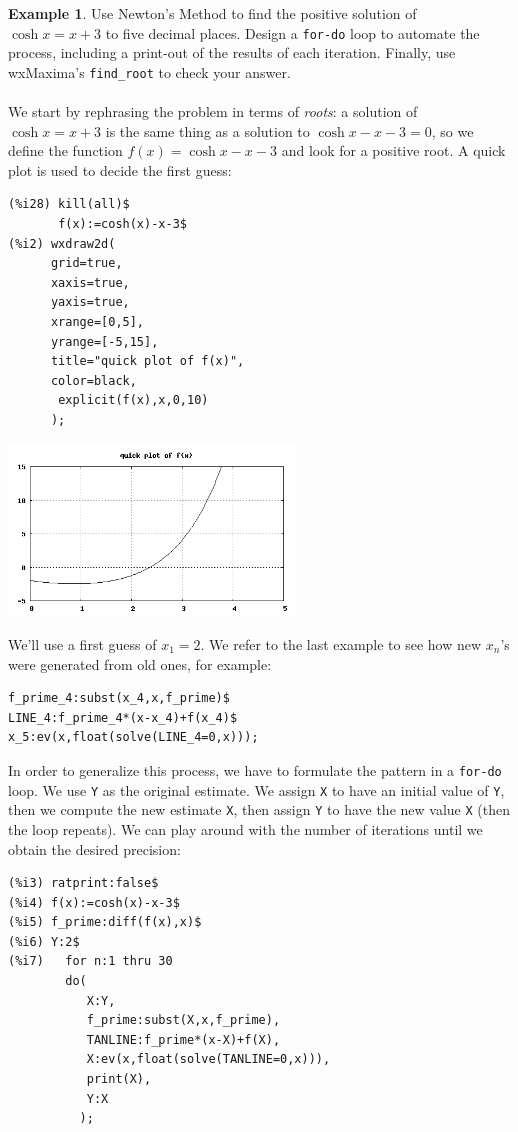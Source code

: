 \documentclass[10.5pt,twoside]{report}
\theoremstyle{definition}
\newtheorem{exmp}{Example}[section]
\begin{document}
\begin{exmp}Use Newton's Method to find the positive solution of $\cosh{x}=x+3$ to five decimal places.  Design a \verb|for-do| loop to automate the process, including a print-out of the results of each iteration. Finally, use wxMaxima's \verb|find_root| to check your answer.\\
${}$\\

We start by rephrasing the problem in terms of \textit{roots}:  a solution of $\cosh{x}=x+3$ is the same thing as a solution to $\cosh{x}-x-3=0$, so we define the function $f(x)=\cosh{x}-x-3$ and look for a positive root.  A quick plot is used to decide the first guess:

\begin{verbatim}
(%i28) kill(all)$
       f(x):=cosh(x)-x-3$
(%i2) wxdraw2d(
      grid=true,
      xaxis=true,
      yaxis=true,
      xrange=[0,5],
      yrange=[-5,15],
      title="quick plot of f(x)",
      color=black,
       explicit(f(x),x,0,10)
      );
\end{verbatim}

\includegraphics[width=3in]{example_5_4_2_1}

We'll use a first guess of $x_1=2$.  We refer to the last example to see how new $x_n$'s were generated from old ones, for example:

\begin{verbatim}
f_prime_4:subst(x_4,x,f_prime)$
LINE_4:f_prime_4*(x-x_4)+f(x_4)$
x_5:ev(x,float(solve(LINE_4=0,x)));
\end{verbatim}

In order to generalize this process, we have to formulate the pattern in a \verb|for-do| loop.  We use \verb|Y| as the original estimate.  We assign \verb|X| to have an initial value of \verb|Y|, then we compute the new estimate \verb|X|, then assign \verb|Y| to have the new value \verb|X| (then the loop repeats).  We can play around with the number of iterations until we obtain the desired precision:

\begin{verbatim}
(%i3) ratprint:false$
(%i4) f(x):=cosh(x)-x-3$
(%i5) f_prime:diff(f(x),x)$
(%i6) Y:2$
(%i7)   for n:1 thru 30
        do(
           X:Y,
           f_prime:subst(X,x,f_prime),
           TANLINE:f_prime*(x-X)+f(X),
           X:ev(x,float(solve(TANLINE=0,x))),
           print(X),
           Y:X
          );
          

\end{verbatim}
\end{exmp}
\end{document}
